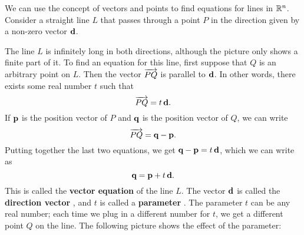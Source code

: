 We can use the concept of vectors and points to find equations for
lines in $\mathbb{R}^n$. Consider a straight line $L$ that passes through a
point $P$ in the direction given by a non-zero vector $\vect{d}$.
\begin{center}
\end{center}
The line $L$ is infinitely long in both directions, although the
picture only shows a finite part of it. To find an equation for this
line, first suppose that $Q$ is an arbitrary point on $L$. Then the
vector $\overrightarrow{PQ}$ is parallel to $\vect{d}$. In other words,
there exists some real number $t$ such that
\begin{equation*}
  \longvect{PQ} = t\,\vect{d}.
\end{equation*}
If $\vect{p}$ is the position vector of $P$ and $\vect{q}$ is the
position vector of $Q$, we can write
\begin{equation*}
  \longvect{PQ} = \vect{q}-\vect{p}.
\end{equation*}
Putting together the last two equations, we get $\vect{q}-\vect{p} =
t\,\vect{d}$, which we can write as
\begin{equation*}
  \vect{q} = \vect{p} + t\,\vect{d}.
\end{equation*}
This is called the \textbf{vector equation}%
%
 of the line $L$. The vector $\vect{d}$ is
called the \textbf{direction vector}%
%
, and $t$ is called a
\textbf{parameter}%
. The parameter $t$ can be any real number; each time
we plug in a different number for $t$, we get a different point $Q$ on
the line. The following picture shows the effect of the parameter:
